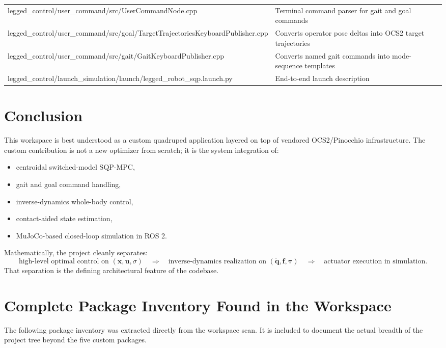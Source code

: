 \documentclass[11pt,a4paper]{article}
\newcommand{\vect}[1]{\bm{#1}}
\begin{document}
\begin{longtable}{>{\ttfamily}p{} >{\raggedright\arraybackslash}p{}}
legged\_control/user\_command/src/UserCommandNode.cpp & Terminal command parser for gait and goal commands \\
legged\_control/user\_command/src/goal/TargetTrajectoriesKeyboardPublisher.cpp & Converts operator pose deltas into OCS2 target trajectories \\
legged\_control/user\_command/src/gait/GaitKeyboardPublisher.cpp & Converts named gait commands into mode-sequence templates \\
legged\_control/launch\_simulation/launch/legged\_robot\_sqp.launch.py & End-to-end launch description \\
\bottomrule
\end{longtable}

\section{Conclusion}
This workspace is best understood as a custom quadruped application layered on top of vendored OCS2/Pinocchio infrastructure. The custom contribution is not a new optimizer from scratch; it is the system integration of:
\begin{itemize}[leftmargin=*]
\item centroidal switched-model SQP-MPC,
\item gait and goal command handling,
\item inverse-dynamics whole-body control,
\item contact-aided state estimation,
\item MuJoCo-based closed-loop simulation in ROS 2.
\end{itemize}

Mathematically, the project cleanly separates:
\begin{equation}
\text{high-level optimal control on } (\vect{x},\vect{u},\sigma)
\quad \Longrightarrow \quad
\text{inverse-dynamics realization on } (\ddot{\vect{q}},\vect{f},\vect{\tau})
\quad \Longrightarrow \quad
\text{actuator execution in simulation}.
\end{equation}
That separation is the defining architectural feature of the codebase.

\appendix
\clearpage

\section{Complete Package Inventory Found in the Workspace}
The following package inventory was extracted directly from the workspace scan. It is included to document the actual breadth of the project tree beyond the five custom packages.
\end{document}
